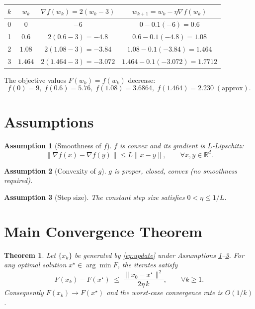 \documentclass{article}
\newtheorem{theorem}{Theorem}
\newtheorem{assumption}{Assumption}
\begin{document}
\begin{center}
\begin{tabular}{c|c|c|c}
$k$ & $w_{k}$ & $\nabla f(w_{k})=2(w_{k}-3)$ & $w_{k+1}=w_{k}-\eta\nabla f(w_{k})$\\ \hline
0 & $0$ & $-6$ & $0-0.1(-6)=0.6$\\
1 & $0.6$ & $2(0.6-3)=-4.8$ & $0.6-0.1(-4.8)=1.08$\\
2 & $1.08$ & $2(1.08-3)=-3.84$ & $1.08-0.1(-3.84)=1.464$\\
3 & $1.464$ & $2(1.464-3)=-3.072$ & $1.464-0.1(-3.072)=1.7712$
\end{tabular}
\end{center}
The objective values $F(w_{k})=f(w_{k})$ decrease:
\[
f(0)=9,\; f(0.6)=5.76,\; f(1.08)=3.6864,\; f(1.464)=2.230\;(\text{approx}).
\]

\newpage
\section*{Assumptions}
\begin{assumption}[Smoothness of $f$]\label{ass:smooth}
$f$ is convex and its gradient is $L$‑Lipschitz:
\[
\|\nabla f(x)-\nabla f(y)\|\le L\|x-y\|,\qquad\forall x,y\in\mathbb{R}^{d}.
\]
\end{assumption}
\begin{assumption}[Convexity of $g$]\label{ass:gconv}
$g$ is proper, closed, convex (no smoothness required).
\end{assumption}
\begin{assumption}[Step size]\label{ass:stepsize}
The constant step size satisfies $0<\eta\le 1/L$.
\end{assumption}

\section*{Main Convergence Theorem}
\begin{theorem}\label{thm:rate}
Let $\{x_{k}\}$ be generated by \eqref{eq:update} under Assumptions \ref{ass:smooth}–\ref{ass:stepsize}.  
For any optimal solution $x^{\star}\in\arg\min F$, the iterates satisfy
\begin{equation}
F(x_{k})-F(x^{\star})\;\le\;\frac{\|x_{0}-x^{\star}\|^{2}}{2\eta\,k},
\qquad\forall k\ge 1.
\label{eq:rate}
\end{equation}
Consequently $F(x_{k})\to F(x^{\star})$ and the worst‑case convergence rate is $O(1/k)$.
\end{theorem}
\end{document}
